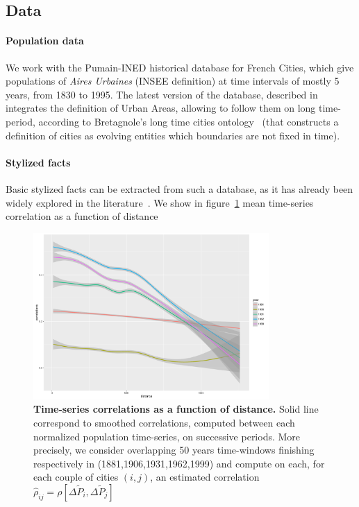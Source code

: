 \documentclass[Royal,sageh,times]{sagej}
\begin{document}
\subsection*{Data}

\paragraph{Population data}

We work with the Pumain-INED historical database for French Cities, which give populations of \emph{Aires Urbaines} (INSEE definition) at time intervals of mostly 5 years, from 1830 to 1995. %
The latest version of the database, described in~\cite{pumain1986fichier} integrates the definition of Urban Areas, allowing to follow them on long time-period, according to Bretagnole's long time cities ontology~\cite{bretagnolle:tel-00459720} (that constructs a definition of cities as evolving entities which boundaries are not fixed in time).


\paragraph{Stylized facts}

Basic stylized facts can be extracted from such a database, as it has already been widely explored in the literature~\cite{}. %
 We show in figure~\ref{fig:ts-correlations} mean time-series correlation as a function of distance




\begin{figure}
\centering
\includegraphics[width=0.8\textwidth]{figures/empirical_tsCorrelations}
\caption{\textbf{Time-series correlations as a function of distance.} Solid line correspond to smoothed correlations, computed between each normalized population time-series, on successive periods. More precisely, we consider overlapping 50 years time-windows finishing respectively in (1881,1906,1931,1962,1999) and compute on each, for each couple of cities $(i,j)$, an estimated correlation $\hat{\rho}_{ij}=\rho\left[\Delta \tilde{P}_i, \Delta \tilde{P}_j\right]$}
\label{fig:ts-correlations}
\end{figure}
\end{document}

